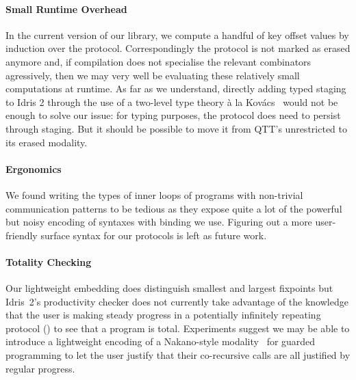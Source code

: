 \documentclass{easychair}
\begin{document}
\paragraph{Small Runtime Overhead}
In the current version of our library, we compute a handful
of key offset values by induction over the protocol. Correspondingly
the protocol is not marked as erased anymore and, if compilation does
not specialise the relevant combinators agressively, then we may very
well be evaluating these relatively small computations at runtime.
%
As far as we understand, directly adding typed staging to Idris 2
through the use of a two-level type theory à la
Kov{\'{a}}cs~\cite{DBLP:journals/pacmpl/Kovacs22} would not be
enough to solve our issue: for typing purposes, the protocol does need
to persist through staging. But it should be possible to move it
from QTT's unrestricted to its erased modality.

\paragraph{Ergonomics}
We found writing the types of inner loops of programs with non-trivial
communication patterns to be tedious as they expose quite a lot of the
powerful but noisy encoding of syntaxes with binding we use.
Figuring out a more user-friendly surface syntax for our protocols is
left as future work.

\paragraph{Totality Checking}
Our lightweight embedding does distinguish smallest and largest fixpoints
but Idris~2's productivity checker does not currently take advantage of the
knowledge that the user is making steady progress in a potentially infinitely
repeating protocol () to see that a program is total.
Experiments suggest we may be able to introduce a lightweight encoding of
a Nakano-style modality~\cite{DBLP:conf/lics/Nakano00} for guarded programming
to let the user justify that their co-recursive calls are all justified by
regular progress.






%
%
%

\end{document}
